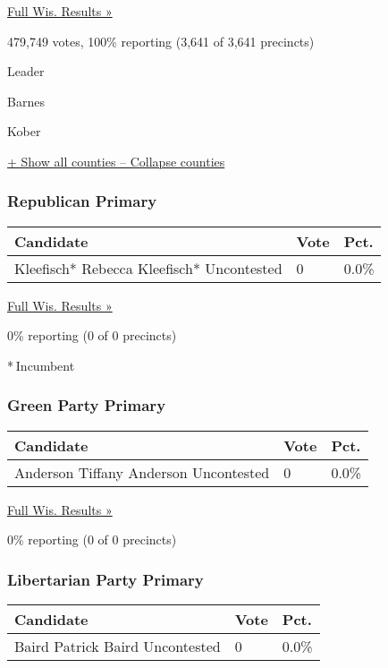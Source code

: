 \href{https://www.nytimes3xbfgragh.onion/elections/results/wisconsin}{Full
Wis. Results »}

479,749 votes, 100\% reporting (3,641 of 3,641 precincts)

Leader

 Barnes

 Kober

\protect\hyperlink{}{+ Show all counties -- Collapse counties}

\hypertarget{republican-primary-9}{%
\subsubsection{Republican Primary}\label{republican-primary-9}}

\begin{longtable}[]{@{}lll@{}}
\toprule
Candidate & Vote & Pct.\tabularnewline
\midrule
\endhead
 Kleefisch* Rebecca Kleefisch* Uncontested & 0 & 0.0\%\tabularnewline
\bottomrule
\end{longtable}

\href{https://www.nytimes3xbfgragh.onion/elections/results/wisconsin}{Full
Wis. Results »}

0\% reporting (0 of 0 precincts)

* Incumbent

\hypertarget{green-party-primary-1}{%
\subsubsection{Green Party Primary}\label{green-party-primary-1}}

\begin{longtable}[]{@{}lll@{}}
\toprule
Candidate & Vote & Pct.\tabularnewline
\midrule
\endhead
 Anderson Tiffany Anderson Uncontested & 0 & 0.0\%\tabularnewline
\bottomrule
\end{longtable}

\href{https://www.nytimes3xbfgragh.onion/elections/results/wisconsin}{Full
Wis. Results »}

0\% reporting (0 of 0 precincts)

\hypertarget{libertarian-party-primary-1}{%
\subsubsection{Libertarian Party
Primary}\label{libertarian-party-primary-1}}

\begin{longtable}[]{@{}lll@{}}
\toprule
Candidate & Vote & Pct.\tabularnewline
\midrule
\endhead
 Baird Patrick Baird Uncontested & 0 & 0.0\%\tabularnewline
\bottomrule
\end{longtable}

